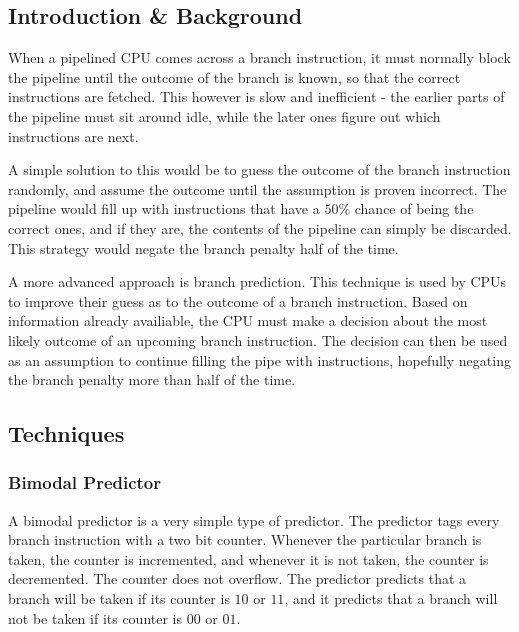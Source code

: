 
\subsection{Introduction \& Background}

When a pipelined CPU comes across a branch instruction, it must normally
block the pipeline until the outcome of the branch is known, so that the
correct instructions are fetched. This however is slow and inefficient -
the earlier parts of the pipeline must sit around idle, while the later
ones figure out which instructions are next.

A simple solution to this would be to guess the outcome of the branch
instruction randomly, and assume the outcome until the assumption is
proven incorrect.
The pipeline would fill up with instructions that have a \(50\%\) chance
of being the correct ones, and if they are, the contents of the pipeline
can simply be discarded.
This strategy would negate the branch penalty half of the time.

A more advanced approach is branch prediction.
This technique is used by CPUs to improve their guess as to the outcome of
a branch instruction.
Based on information already availiable, the CPU must make a decision about
the most likely outcome of an upcoming branch instruction. The decision can
then be used as an assumption to continue filling the pipe with instructions,
hopefully negating the branch penalty more than half of the time.

\subsection{Techniques}

\subsubsection{Bimodal Predictor}

A bimodal predictor is a very simple type of predictor.
The predictor tags every branch instruction with a two bit counter.
Whenever the particular branch is taken, the counter is incremented,
and whenever it is not taken, the counter is decremented.
The counter does not overflow.
The predictor predicts that a branch will be taken if its counter
is \(10\) or \(11\), and it predicts that a branch will not be taken
if its counter is \(00\) or \(01\).

